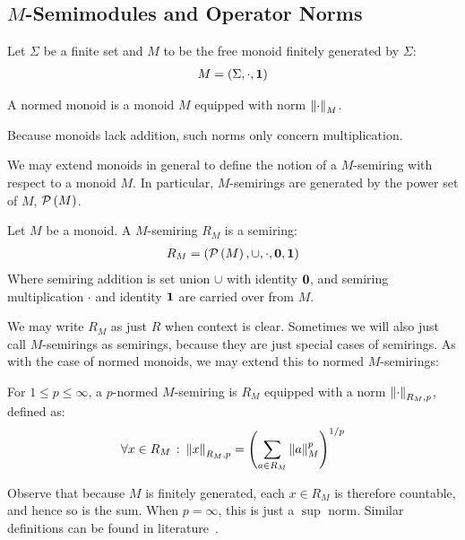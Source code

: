 
\subsection{\(M\)-Semimodules and Operator Norms}
Let \(\Sigma\) be a finite set and
\(M\) to be the free monoid finitely generated by \(\Sigma\):
\begin{align*}
  M = \left(\Sigma, \cdot, \mathbf{1}\right)
\end{align*}

\begin{definition}
  A normed monoid is a monoid \(M\) equipped with norm \(\left\lVert\cdot\right\rVert_M\).
\end{definition}

Because monoids lack addition,
such norms only concern multiplication.

We may extend monoids in general to define the notion of a \(M\)-semiring
with respect to a monoid \(M\).
In particular, \(M\)-semirings are generated by the power set of \(M\),
\(\mathcal{P}\left(M\right)\).

\begin{definition}[\(M\)-Semiring]
  Let \(M\) be a monoid.
  A \(M\)-semiring \(R_M\) is a semiring:
  \begin{align*}
    R_M = \left(\mathcal{P}\left(M\right), \cup, \cdot, \mathbf{0}, \mathbf{1}\right)
  \end{align*}
  Where semiring addition is set union \(\cup\) with identity \(\mathbf{0}\),
  and semiring multiplication \(\cdot\) and identity \(\mathbf{1}\)
  are carried over from \(M\).
\end{definition}

We may write \(R_M\) as just \(R\) when context is clear.
Sometimes we will also just call \(M\)-semirings as semirings,
because they are just special cases of semirings.
As with the case of normed monoids,
we may extend this to normed \(M\)-semirings:

\begin{definition}
  For \(1 \leq p \leq \infty\),
  a \(p\)-normed \(M\)-semiring is \(R_M\)
  equipped with a norm \(\left\lVert\cdot\right\rVert_{R_M, p}\), defined as:
  \begin{align*}
    \forall x \in R_M \ \colon
      \left\lVert x\right\rVert_{R_M, p} = \left(\sum_{a \in R_M} \left\lVert a\right\rVert_M ^p\right)^{1/p}
  \end{align*}
\end{definition}

Observe that because \(M\) is finitely generated,
each \(x \in R_M\) is therefore countable,
and hence so is the sum.
When \(p = \infty\), this is just a \(\sup\) norm.
Similar definitions can be found in literature~\cite{kudlek2000lemmata}.

